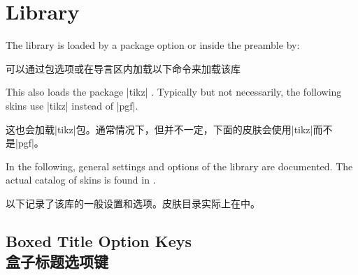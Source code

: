 \section{Library }\label{sec:skins}%
%
The library is loaded by a package option or inside the preamble by:

可以通过包选项或在导言区内加载以下命令来加载该库
\begin{dispListing}
\end{dispListing}
This also loads the package |tikz| \cite{tantau:tikz_and_pgf}. Typically but not necessarily,
the following skins use |tikz| instead of |pgf|.

这也会加载|tikz|包\cite{tantau:tikz_and_pgf}。通常情况下，但并不一定，下面的皮肤会使用|tikz|而不是|pgf|。

In the following, general settings and options of the library are
documented.
The actual catalog of skins is found in .

以下记录了该库的一般设置和选项。皮肤目录实际上在中。

% 

\subsection{Boxed Title Option Keys\\盒子标题选项键}\label{subsec:skinboxedtitle}






